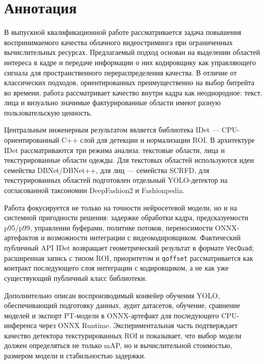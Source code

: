 \documentclass[12pt,a4paper,oneside,openany]{report}
\begin{document}
\setcounter{page}{2}


\chapter*{Аннотация}

В выпускной квалификационной работе рассматривается задача повышения воспринимаемого качества облачного видеостриминга при ограниченных вычислительных ресурсах. Предлагаемый подход основан на выделении областей интереса в кадре и передаче информации о них кодировщику как управляющего сигнала для пространственного перераспределения качества. В отличие от классических подходов, ориентированных преимущественно на выбор битрейта во времени, работа рассматривает качество внутри кадра как неоднородное: текст, лица и визуально значимые фактурированные области имеют разную пользовательскую ценность.

Центральным инженерным результатом является библиотека IDet --- CPU-ориентированный C++ слой для детекции и нормализации ROI. В архитектуре IDet рассматриваются три режима анализа: текстовые области, лица и текстурированные области одежды. Для текстовых областей используются идеи семейства DBNet/DBNet++, для лиц --- семейства SCRFD, для текстурированных областей подготовлен отдельный YOLO-детектор на согласованной таксономии DeepFashion2 и Fashionpedia.

Работа фокусируется не только на точности нейросетевой модели, но и на системной пригодности решения: задержке обработки кадра, предсказуемости p95/p99, управлении буферами, политике потоков, переносимости ONNX-артефактов и возможности интеграции с видеокодировщиком. Фактический публичный API IDet возвращает геометрический результат в формате \texttt{VecQuad}; расширенная запись с типом ROI, приоритетом и \texttt{qoffset} рассматривается как контракт последующего слоя интеграции с кодировщиком, а не как уже существующий публичный класс библиотеки.

Дополнительно описан воспроизводимый конвейер обучения YOLO, обеспечивающий подготовку данных, аудит датасетов, обучение, сравнение моделей и экспорт PT-модели в ONNX-артефакт для последующего CPU-инференса через ONNX Runtime. Экспериментальная часть подтверждает качество детектора текстурированных ROI и показывает, что выбор модели должен определяться не только mAP, но и вычислительной стоимостью, размером модели и стабильностью задержки.
\end{document}
